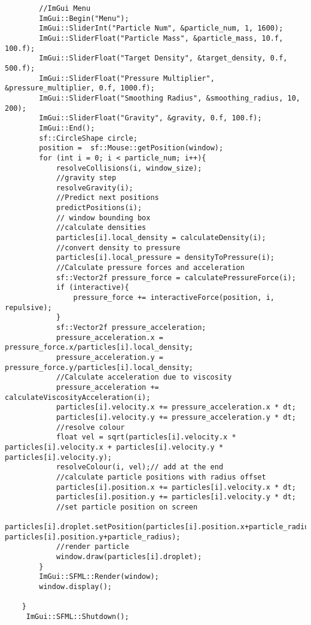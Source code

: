 \documentclass[write-up.tex]{subfiles}
\begin{document}
\begin{appendices}
\begin{lstlisting}
        //ImGui Menu
        ImGui::Begin("Menu");
        ImGui::SliderInt("Particle Num", &particle_num, 1, 1600);
        ImGui::SliderFloat("Particle Mass", &particle_mass, 10.f, 100.f);
        ImGui::SliderFloat("Target Density", &target_density, 0.f, 500.f);
        ImGui::SliderFloat("Pressure Multiplier", &pressure_multiplier, 0.f, 1000.f);
        ImGui::SliderFloat("Smoothing Radius", &smoothing_radius, 10, 200);
        ImGui::SliderFloat("Gravity", &gravity, 0.f, 100.f);
        ImGui::End();
        sf::CircleShape circle;
        position =  sf::Mouse::getPosition(window);
        for (int i = 0; i < particle_num; i++){
            resolveCollisions(i, window_size);
            //gravity step
            resolveGravity(i);
            //Predict next positions
            predictPositions(i);
            // window bounding box
            //calculate densities
            particles[i].local_density = calculateDensity(i);
            //convert density to pressure
            particles[i].local_pressure = densityToPressure(i);
            //Calculate pressure forces and acceleration
            sf::Vector2f pressure_force = calculatePressureForce(i);
            if (interactive){
                pressure_force += interactiveForce(position, i, repulsive);
            }
            sf::Vector2f pressure_acceleration;
            pressure_acceleration.x = pressure_force.x/particles[i].local_density;
            pressure_acceleration.y = pressure_force.y/particles[i].local_density;
            //Calculate acceleration due to viscosity
            pressure_acceleration += calculateViscosityAcceleration(i);
            particles[i].velocity.x += pressure_acceleration.x * dt;
            particles[i].velocity.y += pressure_acceleration.y * dt;
            //resolve colour
            float vel = sqrt(particles[i].velocity.x * particles[i].velocity.x + particles[i].velocity.y * particles[i].velocity.y);
            resolveColour(i, vel);// add at the end
            //calculate particle positions with radius offset
            particles[i].position.x += particles[i].velocity.x * dt;
            particles[i].position.y += particles[i].velocity.y * dt;
            //set particle position on screen
            particles[i].droplet.setPosition(particles[i].position.x+particle_radius, particles[i].position.y+particle_radius);
            //render particle
            window.draw(particles[i].droplet);
        }
        ImGui::SFML::Render(window);
        window.display();

    }
     ImGui::SFML::Shutdown();


\end{lstlisting}
\end{appendices}
\end{document}
